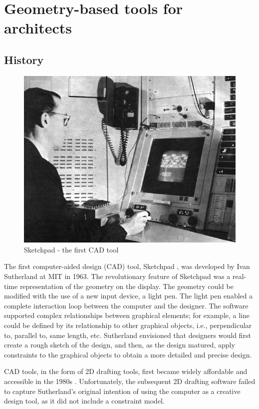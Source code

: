 \section{Geometry-based tools for architects}
\subsection{History}
\begin{figure}
  \includegraphics[width=350pt]{graphics/sketchpad.jpg}
  \caption{Sketchpad - the first CAD tool}
  \label{fig:sketchpad}
\end{figure}
The first computer-aided design (CAD) tool, Sketchpad \cite{Aish2005}, was developed by Ivan Sutherland at MIT in 1963. The revolutionary feature of Sketchpad was a real-time representation of the geometry on the display. The geometry could be modified with the use of a new input device, a light pen. The light pen enabled a complete interaction loop between the computer and the designer. The software supported complex relationships between graphical elements; for example, a line could be defined by its relationship to other graphical objects, i.e., perpendicular to, parallel to, same length, etc. Sutherland envisioned that designers would first create a rough sketch of the design, and then, as the design matured, apply constraints to the graphical objects to obtain a more detailed and precise design. 

CAD tools, in the form of 2D drafting tools, first became widely affordable and accessible in the 1980s \cite{Aish2005}. Unfortunately, the subsequent 2D drafting software failed to capture Sutherland’s original intention of using the computer as a creative design tool, as it did not include a constraint model. 

